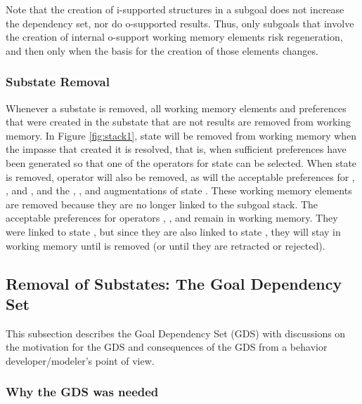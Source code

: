 Note that the creation of i-supported structures in a subgoal does not
increase the dependency set, nor do o-supported results.  Thus, only
subgoals that involve the creation of internal o-support working memory
elements risk regeneration, and then only when the basis for the
creation of those elements changes.

\subsubsection*{Substate Removal}

Whenever a substate is removed, all working memory elements and
preferences that were created in the substate that are not
results are removed from working memory. In Figure \ref{fig:stack1},
state  will be removed from working memory when the impasse
that created it is resolved, that is, when sufficient preferences have
been generated so that one of the operators for state  can be
selected. When state  is removed, operator  will also be removed,
as will the acceptable
preferences for , , and , and the
, , and  augmentations of state
. These working memory elements are removed because they are no
longer linked to the subgoal stack. The acceptable preferences for
operators , , and  remain in working memory. They
were linked to state , but since they are also linked to state
, they will stay in working memory until  is removed (or
until they are retracted or rejected).

\subsection{Removal of Substates:  The Goal Dependency Set}
This subsection describes the Goal Dependency Set (GDS) with discussions 
on the motivation for the GDS and consequences of the GDS from a behavior 
developer/modeler's point of view. 

\subsubsection{Why the GDS was needed}

